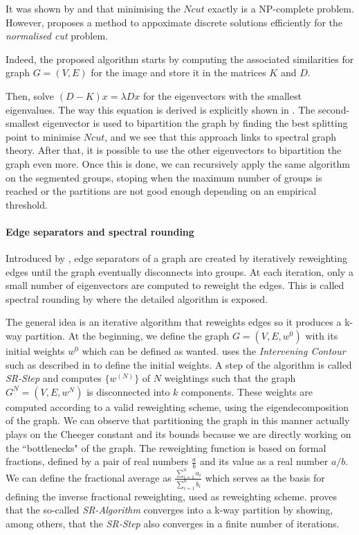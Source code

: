 It was shown by \cite{papadimitriou_npcompleteness_1997} and \cite{shi_normalized_2000} that minimising the \(Ncut\) exactly is a NP-complete problem.
However, \cite{shi_normalized_2000} proposes a method to appoximate discrete solutions efficiently for the \textit{normalised cut} problem.

Indeed, the proposed algorithm starts by computing the associated similarities for graph \(G = (V, E)\) for the image and store it in the matrices \(K\) and \(D\).

Then, solve \((D-K)x = \lambda Dx\) for the eigenvectors with the smallest eigenvalues.
The way this equation is derived is explicitly shown in \cite{shi_normalized_2000}.
The second-smallest eigenvector is used to bipartition the graph by finding the best splitting point to minimise \(Ncut\), and we see that this approach links to spectral graph theory.
After that, it is possible to use the other eigenvectors to bipartition the graph even more.
Once this is done, we can recursively apply the same algorithm on the segmented groups, stoping when the maximum number of groups is reached or the partitions are not good enough depending on an empirical threshold.

\paragraph{Edge separators and spectral rounding}
Introduced by \cite{tolliver_graph_2006}, edge separators of a graph are created by iteratively reweighting edges until the graph eventually disconnects into groups.
At each iteration, only a small number of eigenvectors are computed to reweight the edges.
This is called spectral rounding by \cite{tolliver_graph_2006} where the detailed algorithm is exposed.

The general idea is an iterative algorithm that reweights edges so it produces a k-way partition.
At the beginning, we define the graph \(G = (V, E, w^0)\) with its initial weights \(w^0\) which can be defined as wanted.
\cite{tolliver_graph_2006} uses the \textit{Intervening Contour} such as described in \cite{shi_normalized_2000} to define the initial weights.
A step of the algorithm is called \textit{SR-Step} and computes \(\{w^{(N)}\}\) of \(N\) weightings such that the graph \(G^N = (V, E, w^N)\) is disconnected into \(k\) components.
These weights are computed according to a valid reweighting scheme, using the eigendecomposition of the graph.
We can observe that partitioning the graph in this manner actually plays on the Cheeger constant and its bounds because we are directly working on the ``bottlenecks" of the graph.
The reweighting function is based on formal fractions, defined by a pair of real numbers \(\frac{a}{b}\) and its value as a real number \(a/b\).
We can define the fractional average as \(\frac{\sum_{i=1}^n a_i}{\sum_{i=1}^n b_i}\) which serves as the basis for defining the inverse fractional reweighting, used as reweighting scheme.
\cite{tolliver_graph_2006} proves that the so-called \textit{SR-Algorithm} converges into a k-way partition by showing, among others, that the \textit{SR-Step} also converges in a finite number of iterations.

